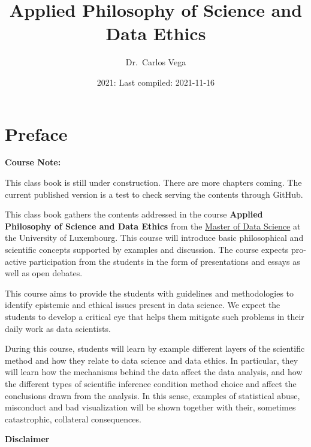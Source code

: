 \documentclass[
]{book}
\title{Applied Philosophy of Science and Data Ethics}
\author{Dr.~Carlos Vega}
\date{2021: Last compiled: 2021-11-16}
\begin{document}
\maketitle

{
\hypersetup{linkcolor=}
\setcounter{tocdepth}{3}
\tableofcontents
}
\hypertarget{preface}{%
\chapter*{Preface}\label{preface}}

\begin{notebox}

\begin{center}
\textbf{Course Note:}

\end{center}

This class book is still under construction. There are more chapters coming. The current published version is a test to check serving the contents through GitHub.

\end{notebox}

This class book gathers the contents addressed in the course \textbf{Applied Philosophy of Science and Data Ethics} from the \href{https://wwwfr.uni.lu/formations/fstm/master_of_data_science}{Master of Data Science} at the University of Luxembourg. This course will introduce basic philosophical and scientific concepts supported by examples and discussion. The course expects pro-active participation from the students in the form of presentations and essays as well as open debates.

This course aims to provide the students with guidelines and methodologies to identify epistemic and ethical issues present in data science. We expect the students to develop a critical eye that helps them mitigate such problems in their daily work as data scientists.

During this course, students will learn by example different layers of the scientific method and how they relate to data science and data ethics. In particular, they will learn how the mechanisms behind the data affect the data analysis, and how the different types of scientific inference condition method choice and affect the conclusions drawn from the analysis. In this sense, examples of statistical abuse, misconduct and bad visualization will be shown together with their, sometimes catastrophic, collateral consequences.

\textbf{Disclaimer}
\end{document}
